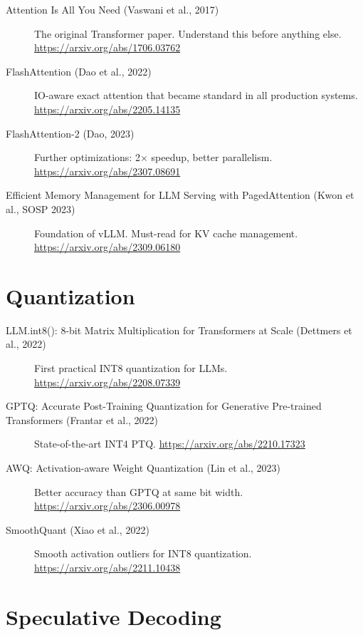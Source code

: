 \documentclass[10pt, oneside, openany]{book}
\begin{document}
\begin{description}
  \item[Attention Is All You Need (Vaswani et al., 2017)]
    The original Transformer paper.  Understand this before anything else.
    \url{https://arxiv.org/abs/1706.03762}

  \item[FlashAttention (Dao et al., 2022)]
    IO-aware exact attention that became standard in all production systems.
    \url{https://arxiv.org/abs/2205.14135}

  \item[FlashAttention-2 (Dao, 2023)]
    Further optimizations: 2$\times$ speedup, better parallelism.
    \url{https://arxiv.org/abs/2307.08691}

  \item[Efficient Memory Management for LLM Serving with PagedAttention
    (Kwon et al., SOSP 2023)]
    Foundation of vLLM.  Must-read for KV cache management.
    \url{https://arxiv.org/abs/2309.06180}
\end{description}

\section*{Quantization}

\begin{description}
  \item[LLM.int8(): 8-bit Matrix Multiplication for Transformers at Scale
    (Dettmers et al., 2022)]
    First practical INT8 quantization for LLMs.
    \url{https://arxiv.org/abs/2208.07339}

  \item[GPTQ: Accurate Post-Training Quantization for Generative Pre-trained
    Transformers (Frantar et al., 2022)]
    State-of-the-art INT4 PTQ.
    \url{https://arxiv.org/abs/2210.17323}

  \item[AWQ: Activation-aware Weight Quantization (Lin et al., 2023)]
    Better accuracy than GPTQ at same bit width.
    \url{https://arxiv.org/abs/2306.00978}

  \item[SmoothQuant (Xiao et al., 2022)]
    Smooth activation outliers for INT8 quantization.
    \url{https://arxiv.org/abs/2211.10438}
\end{description}

\section*{Speculative Decoding}
\end{document}
